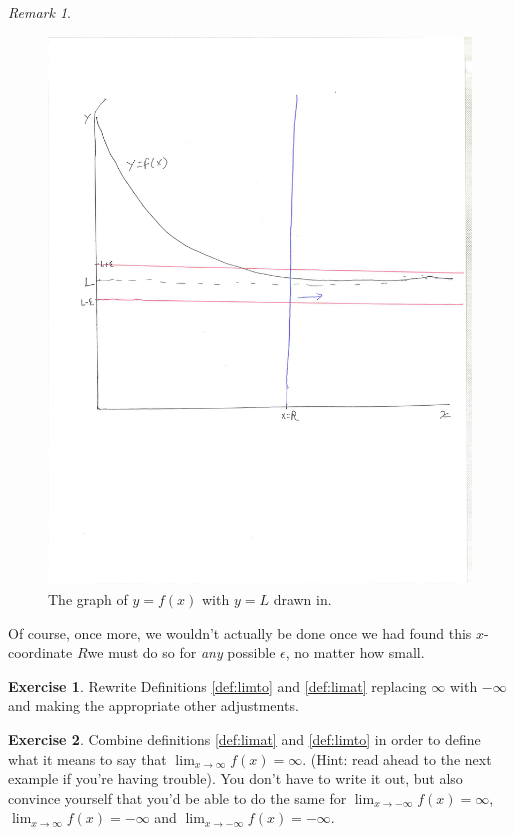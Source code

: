 \documentclass[english]{book}
\theoremstyle{remark}
\newtheorem{remark}{Remark}[theorem]
\theoremstyle{definition}
\newtheorem{excs}{Exercise}[chapter]
\newtheorem*{next week}{Next Week}
\newcommand{\dlim}{\displaystyle\lim}
\begin{document}
\begin{remark}
\begin{figure}[h!]\centering
	\includegraphics[scale=0.5,trim={0 3.3in 12mm 36mm},clip]{1graph6} \caption{The graph of $y=f(x)$ with $y=L$ drawn in.\label{fig:1graph6}}
\end{figure}

Of course, once more, we wouldn't actually be done once we had found this $x$-coordinate $R$\textemdash we must do so for \emph{any} possible $\epsilon$, no matter how small.
\end{remark}
\begin{excs}
	Rewrite Definitions \ref{def:limto} and \ref{def:limat} replacing $\infty$ with $-\infty$ and making the appropriate other adjustments.
\end{excs}
\begin{excs}
Combine definitions \ref{def:limat} and \ref{def:limto} in order to define what it means to say that $\dlim_{x\to \infty}f(x)=\infty$. (Hint: read ahead to the next example if you're having trouble). You don't have to write it out, but also convince yourself that you'd be able to do the same for $\dlim_{x\to -\infty}f(x)=\infty$, $\dlim_{x\to \infty} f(x)=-\infty$ and $\dlim_{x\to -\infty} f(x)=-\infty$.  
\end{excs}
\end{document}
